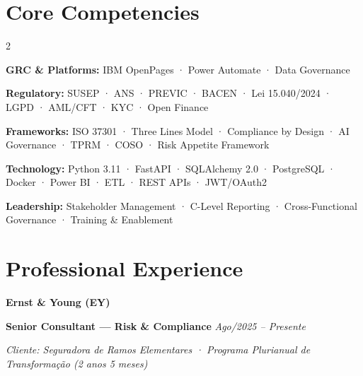 \documentclass[10pt, a4paper]{article}
\newcommand{\companyname}[1]{%
  \vspace{0.8em}%
  {\sffamily\fontsize{11pt}{13pt}\selectfont\bfseries\color{ExecutiveNavy}#1}%
  \vspace{0.3em}%
}
\newcommand{\roletitle}[2]{%
  \vspace{0.4em}%
  {\sffamily\fontsize{10pt}{12pt}\selectfont\bfseries\color{GraphiteGrey}#1}%
  \hfill%
  {\sffamily\fontsize{9pt}{11pt}\selectfont\itshape\color{GraphiteGrey}#2}%
  \vspace{0.2em}%
}
\newcommand{\clientcontext}[1]{%
  {\sffamily\fontsize{9pt}{11pt}\selectfont\itshape\color{GraphiteGrey}#1}%
  \vspace{0.3em}%
}
\newcommand{\competencygroup}[2]{%
  \textbf{\sffamily\small\color{ExecutiveNavy}#1:} {\small\color{GraphiteGrey}#2}%
}
\begin{document}
\section*{Core Competencies}

\begin{multicols}{2}
\raggedright
\competencygroup{GRC \& Platforms}{IBM OpenPages · Power Automate · Data Governance}

\competencygroup{Regulatory}{SUSEP · ANS · PREVIC · BACEN · Lei 15.040/2024 · LGPD · AML/CFT · KYC · Open Finance}

\competencygroup{Frameworks}{ISO 37301 · Three Lines Model · Compliance by Design · AI Governance · TPRM · COSO · Risk Appetite Framework}

\competencygroup{Technology}{Python 3.11 · FastAPI · SQLAlchemy 2.0 · PostgreSQL · Docker · Power BI · ETL · REST APIs · JWT/OAuth2}

\competencygroup{Leadership}{Stakeholder Management · C-Level Reporting · Cross-Functional Governance · Training \& Enablement}
\end{multicols}

\vspace{0.5em}

\section*{Professional Experience}

\companyname{Ernst \& Young (EY)}

\roletitle{Senior Consultant — Risk \& Compliance}{Ago/2025 – Presente}
\clientcontext{Cliente: Seguradora de Ramos Elementares · Programa Plurianual de Transformação (2 anos 5 meses)}
\end{document}

